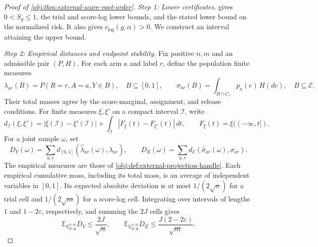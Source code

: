 \documentclass[11pt]{article}
\begin{document}
\begin{proof}[Proof of \cref{obj:thm:external-score-root-order}]
\emph{Step 1: Lower certificates.}
 gives \(0<S_g\leq1\), the trial and score-log lower bounds, and the stated lower bound on the normalized risk. It also gives \(c_{\mathrm{log}}(g,\alpha)>0\). We construct an interval attaining the upper bound. %

\emph{Step 2: Empirical distances and endpoint stability.}
Fix positive \(n,m\) and an admissible pair \((P,H)\). For each arm \(a\) and label \(r\), define the population finite measures
\[
\lambda_{ar}(B)=P(R=r,A=a,Y\in B),\quad B\subseteq[0,1],
\qquad
\sigma_{ar}(B)=\int_{B\cap C_r}p_a(e)\,H(de),\quad B\subseteq\mathcal E.
\]
Their total masses agree by the score-marginal, assignment, and release conditions. For finite measures \(\xi,\xi'\) on a compact interval \(\mathcal I\), write
\[
d_{\mathcal I}(\xi,\xi')
=
|\xi(\mathcal I)-\xi'(\mathcal I)|
+\int_{\mathcal I}|F_\xi(t)-F_{\xi'}(t)|\,dt,
\qquad F_\xi(t)=\xi((-\infty,t]).
\]
For a joint sample \(\omega\), set
\[
D_Y(\omega)=\sum_{a,r}d_{[0,1]}(\widehat\lambda_{ar}(\omega),\lambda_{ar}),
\qquad
D_E(\omega)=\sum_{a,r}d_{\mathcal E}(\widehat\sigma_{ar}(\omega),\sigma_{ar}).
\]
The empirical measures are those of \cref{obj:def:external-projection-handle}. Each empirical cumulative mass, including its total mass, is an average of independent variables in \([0,1]\). Its expected absolute deviation is at most \(1/(2\sqrt n)\) for a trial cell and \(1/(2\sqrt m)\) for a score-log cell. Integrating over intervals of lengths \(1\) and \(1-2\varepsilon\), respectively, and summing the \(2J\) cells gives
\[
\mathbb E_{\mathbb Q_{P,H}^{n,m}}D_Y\leq\frac{2J}{\sqrt n},
\qquad
\mathbb E_{\mathbb Q_{P,H}^{n,m}}D_E
\leq\frac{J(2-2\varepsilon)}{\sqrt m}. \label{eq:external-root-order-mean}
\]


\end{proof}
\end{document}
